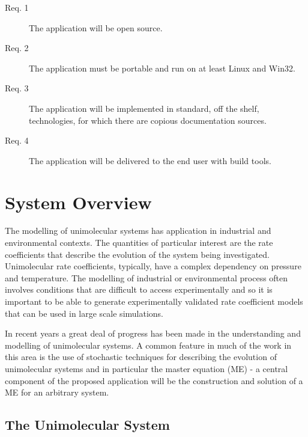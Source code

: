 \begin{description}
\item[Req. 1]{The application will be open source.}
\item[Req. 2]{The application must be portable and run on at least Linux and Win32.}
\item[Req. 3]{The application will be implemented in standard, off the shelf, technologies, for which there are copious documentation sources.}
\item[Req. 4]{The application will be delivered to the end user with build tools.}
\end{description}

\section{System Overview}\label{sec:SystemOverview}

The modelling of unimolecular systems has application in industrial and environmental contexts. The quantities of particular interest are the rate coefficients that describe the evolution of the system being investigated. Unimolecular rate coefficients, typically, have a complex dependency on pressure and temperature.  The modelling of industrial or environmental process often involves conditions that are difficult to access experimentally and so it is important to be able to generate experimentally validated rate coefficient models that can be used in large scale simulations.

In recent years a great deal of progress has been made in the understanding and modelling of unimolecular systems. A common feature in much of the work in this area is the use of stochastic techniques for describing the evolution of unimolecular systems and in particular the master equation (ME) - a central component of the proposed application will be the construction and solution of a ME for an arbitrary system.

\subsection{The Unimolecular System
}\label{sec:TheUnimolecularSystem}

